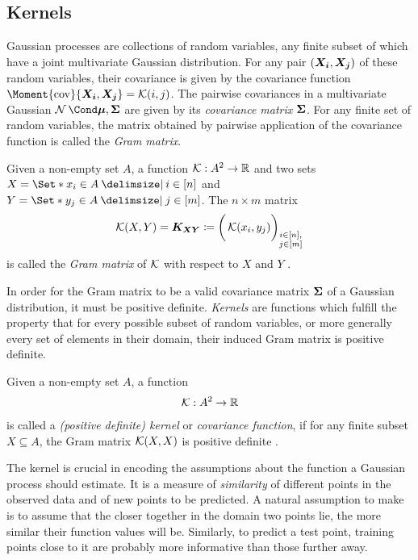 \subsection{Kernels}
Gaussian processes are collections of random variables, any finite subset of which have a joint multivariate Gaussian distribution.
For any pair $(\bm{X_i}, \bm{X_j})$ of these random variables, their covariance is given by the covariance function $\Moment{\cov}{\rv{X_i}, \rv{X_j}} = \K(i, j)$.
The pairwise covariances in a multivariate Gaussian $\Gaussian{\mat{\mu}, \mat{\Sigma}}$ are given by its \emph{covariance matrix} $\bm{\Sigma}$.
For any finite set of random variables, the matrix obtained by pairwise application of the covariance function is called the \emph{Gram matrix}.
\begin{definition}
    Given a non-empty set $A$, a function $\operatorname{\mathcal{K}} : A^2 \to \mathbb{R}$ and two sets $X = \Set*{x_i \in A \with i \in [n]}$ and $Y = \Set*{y_j \in A \with j \in [m]}$.
    The $n \times m$ matrix
    \begin{align}
        \operatorname{\mathcal{K}}(X, Y) = \bm{K_{XY}} \coloneqq \bigg( \operatorname{\mathcal{K}}(x_i, y_j) \bigg)_{\substack{i \in [n], \\ j \in [m]}}
    \end{align}
    is called the \emph{Gram matrix} of $\operatorname{\mathcal{K}}$ with respect to $X$ and $Y$ \cite{scholkopf_learning_2002}.
\end{definition}
In order for the Gram matrix to be a valid covariance matrix $\bm{\Sigma}$ of a Gaussian distribution, it must be positive definite.
\emph{Kernels} are functions which fulfill the property that for every possible subset of random variables, or more generally every set of elements in their domain, their induced Gram matrix is positive definite.
\begin{definition}[Kernel]
    Given a non-empty set $A$, a function
    \begin{align}
        \operatorname{\mathcal{K}} : A^2 \to \mathbb{R}
    \end{align}
    is called a \emph{(positive definite) kernel} or \emph{covariance function}, if for any finite subset $X \subseteq A$, the Gram matrix $\operatorname{\mathcal{K}}(X, X)$ is positive definite \cite{scholkopf_learning_2002}.
\end{definition}
The kernel is crucial in encoding the assumptions about the function a Gaussian process should estimate.
It is a measure of \emph{similarity} of different points in the observed data and of new points to be predicted.
A natural assumption to make is to assume that the closer together in the domain two points lie, the more similar their function values will be.
Similarly, to predict a test point, training points close to it are probably more informative than those further away.

